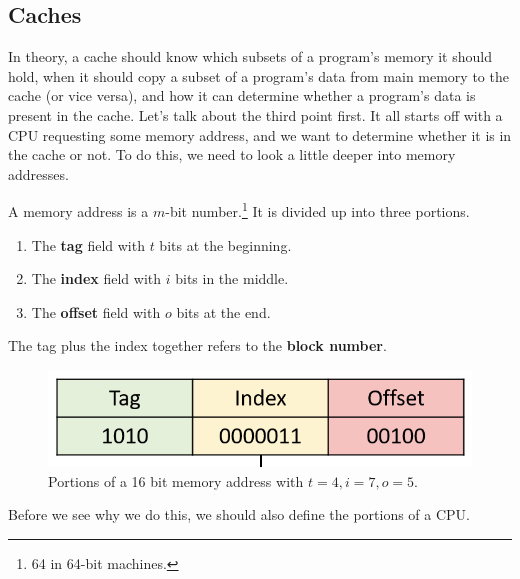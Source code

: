 \subsection{Caches}

    In theory, a cache should know which subsets of a program's memory it should hold, when it should copy a subset of a program's data from main memory to the cache (or vice versa), and how it can determine whether a program's data is present in the cache. Let's talk about the third point first. It all starts off with a CPU requesting some memory address, and we want to determine whether it is in the cache or not. To do this, we need to look a little deeper into memory addresses. 

    \begin{definition}
      A memory address is a $m$-bit number.\footnote{64 in 64-bit machines.} It is divided up into three portions. 
      \begin{enumerate}
        \item The \textbf{tag} field with $t$ bits at the beginning.
        \item The \textbf{index} field with $i$ bits in the middle. 
        \item The \textbf{offset} field with $o$ bits at the end.
      \end{enumerate}
      The tag plus the index together refers to the \textbf{block number}. 
      \begin{figure}[H]
        \centering 
        \includegraphics[scale=0.4]{img/memory_portions.png}
        \caption{Portions of a 16 bit memory address with $t = 4, i = 7, o = 5$. } 
        \label{fig:memory_portions}
      \end{figure}
    \end{definition}

    Before we see why we do this, we should also define the portions of a CPU. 

